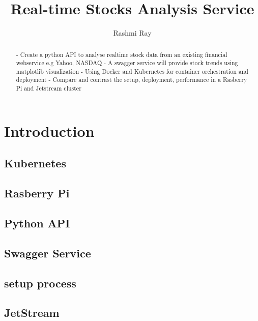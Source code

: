 
\title{Real-time Stocks Analysis Service}

\author{Rashmi Ray}

\renewcommand{\shortauthors}{Uma Kugan}
\begin{abstract}
 - Create a python API to analyse realtime stock data from an existing financial webservice e.g Yahoo, NASDAQ
 - A swagger service will provide stock trends using matplotlib visualization
 - Using Docker and Kubernetes for container orchestration and deployment
 - Compare and contrast the setup, deployment, performance  in a Rasberry Pi and Jetstream cluster

\end{abstract}



\maketitle

\section{Introduction}


\subsection{Kubernetes}

\subsection{Rasberry Pi}

\subsection{Python API}
\subsection{Swagger Service}
\subsection{setup process}
\subsection{JetStream}

